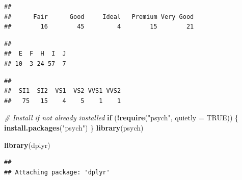 \documentclass[
]{article}
\newenvironment{Shaded}{\begin{snugshade}}{\end{snugshade}}
\newcommand{\AttributeTok}[1]{\textcolor[rgb]{0.13,0.29,0.53}{#1}}
\newcommand{\CommentTok}[1]{\textcolor[rgb]{0.56,0.35,0.01}{\textit{#1}}}
\newcommand{\ConstantTok}[1]{\textcolor[rgb]{0.56,0.35,0.01}{#1}}
\newcommand{\ControlFlowTok}[1]{\textcolor[rgb]{0.13,0.29,0.53}{\textbf{#1}}}
\newcommand{\FunctionTok}[1]{\textcolor[rgb]{0.13,0.29,0.53}{\textbf{#1}}}
\newcommand{\NormalTok}[1]{#1}
\newcommand{\SpecialCharTok}[1]{\textcolor[rgb]{0.81,0.36,0.00}{\textbf{#1}}}
\newcommand{\StringTok}[1]{\textcolor[rgb]{0.31,0.60,0.02}{#1}}
\begin{document}
\begin{Shaded}
\end{Shaded}

\begin{verbatim}
## 
##      Fair      Good     Ideal   Premium Very Good 
##        16        45         4        15        21
\end{verbatim}

\begin{Shaded}
\end{Shaded}

\begin{verbatim}
## 
##  E  F  H  I  J 
## 10  3 24 57  7
\end{verbatim}

\begin{Shaded}
\end{Shaded}

\begin{verbatim}
## 
##  SI1  SI2  VS1  VS2 VVS1 VVS2 
##   75   15    4    5    1    1
\end{verbatim}

\begin{Shaded}
\begin{Highlighting}[]
\CommentTok{\# Install if not already installed}
\ControlFlowTok{if}\NormalTok{ (}\SpecialCharTok{!}\FunctionTok{require}\NormalTok{(}\StringTok{"psych"}\NormalTok{, }\AttributeTok{quietly =} \ConstantTok{TRUE}\NormalTok{)) \{}
  \FunctionTok{install.packages}\NormalTok{(}\StringTok{"psych"}\NormalTok{)}
\NormalTok{\}}
\FunctionTok{library}\NormalTok{(psych)}

\FunctionTok{library}\NormalTok{(dplyr)}
\end{Highlighting}
\end{Shaded}

\begin{verbatim}
## 
## Attaching package: 'dplyr'
\end{verbatim}
\end{document}
